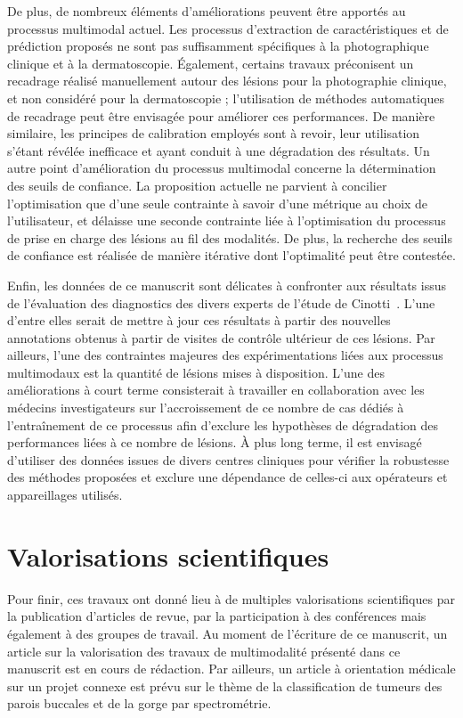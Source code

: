 De plus, de nombreux éléments d'améliorations peuvent être apportés au processus multimodal actuel. Les processus d'extraction de caractéristiques et de prédiction proposés ne sont pas suffisamment spécifiques à la photographique clinique et à la dermatoscopie. Également, certains travaux préconisent un recadrage réalisé manuellement autour des lésions pour la photographie clinique, et non considéré pour la dermatoscopie ; l'utilisation de méthodes automatiques de recadrage peut être envisagée pour améliorer ces performances. De manière similaire, les principes de calibration employés sont à revoir, leur utilisation s'étant révélée inefficace et ayant conduit à une dégradation des résultats. Un autre point d'amélioration du processus multimodal concerne la détermination des seuils de confiance. La proposition actuelle ne parvient à concilier l'optimisation que d'une seule contrainte à savoir d'une métrique au choix de l'utilisateur, et délaisse une seconde contrainte liée à l'optimisation du processus de prise en charge des lésions au fil des modalités. De plus, la recherche des seuils de confiance est réalisée de manière itérative dont l'optimalité peut être contestée.\par

Enfin, les données de ce manuscrit sont délicates à confronter aux résultats issus de l'évaluation des diagnostics des divers experts de l'étude de Cinotti~. L'une d'entre elles serait de mettre à jour ces résultats à partir des nouvelles annotations obtenus à partir de visites de contrôle ultérieur de ces lésions. Par ailleurs, l'une des contraintes majeures des expérimentations liées aux processus multimodaux est la quantité de lésions mises à disposition. L'une des améliorations à court terme consisterait à travailler en collaboration avec les médecins investigateurs sur l'accroissement de ce nombre de cas dédiés à l'entraînement de ce processus afin d'exclure les hypothèses de dégradation des performances liées à ce nombre de lésions. À plus long terme, il est envisagé d'utiliser des données issues de divers centres cliniques pour vérifier la robustesse des méthodes proposées et exclure une dépendance de celles-ci aux opérateurs et appareillages utilisés.\par

\clearpage

\section*{Valorisations scientifiques}
Pour finir, ces travaux ont donné lieu à de multiples valorisations scientifiques par la publication d'articles de revue, par la participation à des conférences mais également à des groupes de travail. Au moment de l'écriture de ce manuscrit, un article sur la valorisation des travaux de multimodalité présenté dans ce manuscrit est en cours de rédaction. Par ailleurs, un article à orientation médicale sur un projet connexe est prévu sur le thème de la classification de tumeurs des parois buccales et de la gorge par spectrométrie.\par

